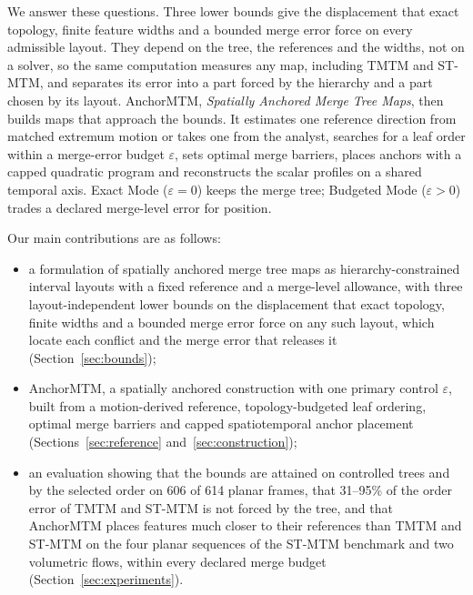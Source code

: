 \documentclass[review]{vgtc}
\begin{document}
We answer these questions. Three lower bounds give the displacement that exact topology, finite feature widths and a bounded merge error force on every admissible layout. They depend on the tree, the references and the widths, not on a solver, so the same computation measures any map, including TMTM and ST-MTM, and separates its error into a part forced by the hierarchy and a part chosen by its layout. AnchorMTM, \emph{Spatially Anchored Merge Tree Maps}, then builds maps that approach the bounds. It estimates one reference direction from matched extremum motion or takes one from the analyst, searches for a leaf order within a merge-error budget $\varepsilon$, sets optimal merge barriers, places anchors with a capped quadratic program and reconstructs the scalar profiles on a shared temporal axis. Exact Mode ($\varepsilon=0$) keeps the merge tree; Budgeted Mode ($\varepsilon>0$) trades a declared merge-level error for position.

Our main contributions are as follows:
\begin{itemize}
\setlength{\itemsep}{2pt}
\setlength{\parsep}{0pt}
\item a formulation of spatially anchored merge tree maps as hierarchy-constrained interval layouts with a fixed reference and a merge-level allowance, with three layout-independent lower bounds on the displacement that exact topology, finite widths and a bounded merge error force on any such layout, which locate each conflict and the merge error that releases it (Section~\ref{sec:bounds});
\item AnchorMTM, a spatially anchored construction with one primary control $\varepsilon$, built from a motion-derived reference, topology-budgeted leaf ordering, optimal merge barriers and capped spatiotemporal anchor placement (Sections~\ref{sec:reference} and~\ref{sec:construction});
\item an evaluation showing that the bounds are attained on controlled trees and by the selected order on 606 of 614 planar frames, that 31--95\% of the order error of TMTM and ST-MTM is not forced by the tree, and that AnchorMTM places features much closer to their references than TMTM and ST-MTM on the four planar sequences of the ST-MTM benchmark and two volumetric flows, within every declared merge budget (Section~\ref{sec:experiments}).
\end{itemize}

\end{document}
